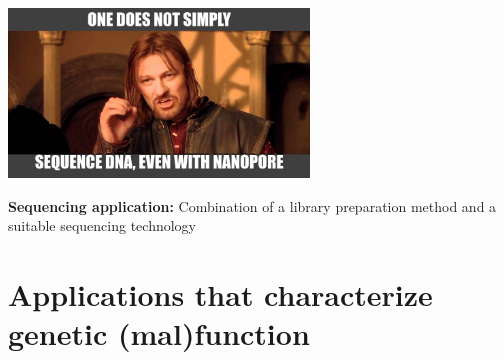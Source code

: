 \documentclass[10pt]{beamer}
\newcommand{\feature}[1]{{\color{scLime} \textbf{#1}}}
\begin{document}
\begin{frame}[standout]{}
	\includegraphics[width=0.6\textwidth]{./figures/onedoesnotsimplyB2.jpg} \par \vspace{1cm} \par
	{\normalsize \feature{Sequencing application:} Combination of a library preparation method and a suitable sequencing technology}
\end{frame}


\section{Applications that characterize genetic (mal)function}

\end{document}
